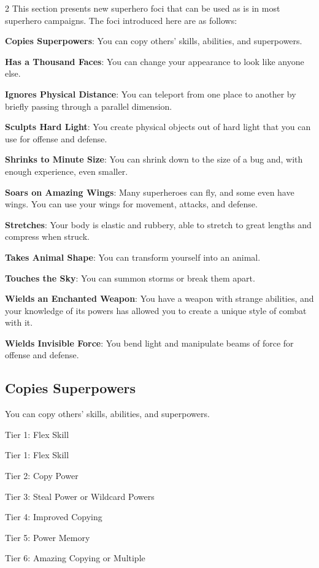 \begin{multicols}{2}
This section presents new superhero foci that can be used as is in most superhero campaigns. The foci introduced here are as follows:

\textbf{Copies Superpowers}: You can copy others’ skills, abilities, and superpowers.

\textbf{Has a Thousand Faces}: You can change your appearance to look like anyone else.

\textbf{Ignores Physical Distance}: You can teleport from one place to another by briefly passing through a parallel dimension.

\textbf{Sculpts Hard Light}: You create physical objects out of hard light that you can use for offense and defense.

\textbf{Shrinks to Minute Size}: You can shrink down to the size of a bug and, with enough experience, even smaller.

\textbf{Soars on Amazing Wings}: Many superheroes can fly, and some even have wings. You can use your wings for movement, attacks, and defense.

\textbf{Stretches}: Your body is elastic and rubbery, able to stretch to great lengths and compress when struck.

\textbf{Takes Animal Shape}: You can transform yourself into an animal.

\textbf{Touches the Sky}: You can summon storms or break them apart.

\textbf{Wields an Enchanted Weapon}: You have a weapon with strange abilities, and your knowledge of its powers has allowed you to create a unique style of combat with it.

\textbf{Wields Invisible Force}: You bend light and manipulate beams of force for offense and defense.

\subsection{Copies Superpowers} 
You can copy others’ skills, abilities, and superpowers.

Tier 1: Flex Skill 

Tier 1: Flex Skill 

Tier 2: Copy Power

Tier 3: Steal Power or Wildcard Powers

Tier 4: Improved Copying

Tier 5: Power Memory

Tier 6: Amazing Copying or Multiple


\end{multicols}
